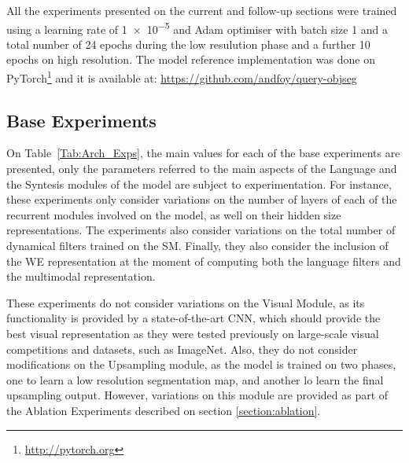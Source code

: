 All the experiments presented on the current and follow-up sections were trained using a learning rate of \num{1e-5} and Adam \cite{DBLP:journals/corr/KingmaB14} optimiser with batch size 1 and a total number of 24 epochs during the low resulution phase and a further 10 epochs on high resolution. The model reference implementation was done on PyTorch\footnote{\url{http://pytorch.org}} and it is available at: \url{https://github.com/andfoy/query-objseg}


\subsection{Base Experiments}
\label{section:base}
On Table~\ref{Tab:Arch_Exps}, the main values for each of the base experiments are presented, only the parameters referred to the main aspects of the Language and the Syntesis modules of the model are subject to experimentation. For instance, these experiments only consider variations on the number of layers of each of the recurrent modules involved on the model, as well on their hidden size representations. The experiments also consider variations on the total number of dynamical filters trained on the SM. Finally, they also consider the inclusion of the WE representation at the moment of computing both the language filters and the multimodal representation.

These experiments do not consider variations on the Visual Module, as its functionality is provided by a state-of-the-art CNN, which should provide the best visual representation as they were tested previously on large-scale visual competitions and datasets, such as ImageNet. Also, they do not consider modifications on the Upsampling module, as the model is trained on two phases, one to learn a low resolution segmentation map, and another lo learn the final upsampling output. However, variations on this module are provided as part of the Ablation Experiments described on section \ref{section:ablation}.

